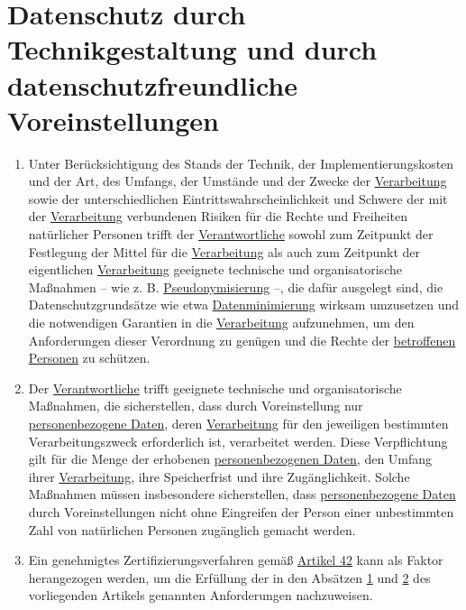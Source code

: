 \chapter{Datenschutz durch Technikgestaltung und durch datenschutzfreundliche Voreinstellungen}
\label{ch:25}


\begin{enumerate}

  \item Unter Berücksichtigung des Stands der Technik, der Implementierungskosten und der Art, des Umfangs, der Umstände
   und der Zwecke der \hyperref[itm:04-2]{Verarbeitung} sowie der unterschiedlichen Eintrittswahrscheinlichkeit und
   Schwere der mit der
   \hyperref[itm:04-2]{Verarbeitung} verbundenen Risiken für die Rechte und Freiheiten natürlicher Personen trifft
    der \hyperref[itm:04-7]{Verantwortliche} sowohl zum Zeitpunkt der Festlegung der Mittel für die \hyperref[itm:04-2]
    {Verarbeitung} als auch zum Zeitpunkt der eigentlichen
   \hyperref[itm:04-2]{Verarbeitung} geeignete technische und organisatorische Maßnahmen -- wie z. B. \hyperref
    [itm:04-5]{Pseudonymisierung} --, die dafür ausgelegt sind, die Datenschutzgrundsätze wie etwa
    \hyperref[itm:05-1c]{Datenminimierung} wirksam umzusetzen und die notwendigen Garantien in die \hyperref[itm:04-2]
     {Verarbeitung} aufzunehmen, um den Anforderungen dieser Verordnung zu genügen und die Rechte der \hyperref
     [itm:04-1]{betroffenen Personen} zu schützen.%
  \label{itm:25-1}

  \item Der \hyperref[itm:04-7]{Verantwortliche} trifft geeignete technische und organisatorische Maßnahmen, die
   sicherstellen, dass durch Voreinstellung nur \hyperref[itm:04-1]{personenbezogene Daten},
   deren \hyperref[itm:04-2]{Verarbeitung} für den jeweiligen bestimmten Verarbeitungszweck erforderlich ist,
   verarbeitet werden. Diese Verpflichtung gilt für die Menge der erhobenen
   \hyperref[itm:04-1]{personenbezogenen Daten}, den Umfang ihrer \hyperref[itm:04-2]{Verarbeitung}, ihre Speicherfrist
    und ihre Zugänglichkeit. Solche Maßnahmen müssen insbesondere sicherstellen, dass \hyperref[itm:04-1]
    {personenbezogene Daten} durch Voreinstellungen nicht ohne Eingreifen der Person einer unbestimmten Zahl von
    natürlichen Personen zugänglich gemacht werden.%
  \label{itm:25-2}

  \item Ein genehmigtes Zertifizierungsverfahren gemäß \hyperref[ch:42]{Artikel 42} kann als Faktor herangezogen werden,
   um die Erfüllung der in den Absätzen \hyperref[itm:25-1]{1} und \hyperref[itm:25-2]{2} des vorliegenden Artikels
   genannten Anforderungen nachzuweisen.%
  \label{itm:25-3}

\end{enumerate}


